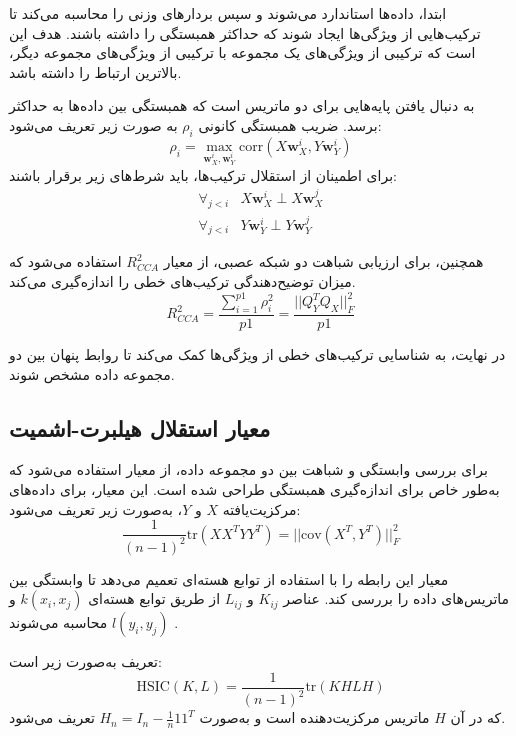  ابتدا، داده‌ها استاندارد می‌شوند و سپس  
 بردارهای وزنی را محاسبه می‌کند تا ترکیب‌هایی از ویژگی‌ها ایجاد شوند که حداکثر همبستگی را داشته باشند. هدف این است که ترکیبی از ویژگی‌های یک مجموعه با ترکیبی از ویژگی‌های مجموعه دیگر، بالاترین ارتباط را داشته باشد.  
 
 به دنبال یافتن پایه‌هایی برای دو ماتریس است که همبستگی بین داده‌ها به حداکثر برسد. ضریب همبستگی کانونی  
 \(\rho_i\)  
 به صورت زیر تعریف می‌شود:  
 \[
 \rho_i = \max_{\mathbf{w}_X^i, \mathbf{w}_Y^i} \text{corr}(X \mathbf{w}_X^i, Y \mathbf{w}_Y^i)
 \]  
 برای اطمینان از استقلال ترکیب‌ها، باید شرط‌های زیر برقرار باشند:  
 \[
 \begin{array}{ll}
 	\forall_{j<i} & X \mathbf{w}_X^i \perp X \mathbf{w}_X^j \\
 	\forall_{j<i} & Y \mathbf{w}_Y^i \perp Y \mathbf{w}_Y^j
 \end{array}
 \]  
 
 همچنین، برای ارزیابی شباهت دو شبکه عصبی، از معیار  
 \( R^2_{CCA} \)  
 استفاده می‌شود که میزان توضیح‌دهندگی ترکیب‌های خطی را اندازه‌گیری می‌کند.  
 \[
 R^2_{CCA} = \frac{\sum_{i=1}^{p1} \rho^2_i}{p1} = \frac{||Q^T_Y Q_X||^2_F}{p1}
 \]  
 
 در نهایت،  
 به شناسایی ترکیب‌های خطی از ویژگی‌ها کمک می‌کند تا روابط پنهان بین دو مجموعه داده مشخص شوند. 
 
 
 
 
 
 \subsection{
 	معیار استقلال هیلبرت-اشمیت%
 }
 برای بررسی وابستگی و شباهت بین دو مجموعه داده، از معیار  
 استفاده می‌شود که به‌طور خاص برای اندازه‌گیری همبستگی طراحی شده است. این معیار، برای داده‌های مرکزیت‌یافته \( X \) و \( Y \)، به‌صورت زیر تعریف می‌شود:  
 \[
 \frac{1}{(n - 1)^2} \text{tr}(XX^TYY^T) = ||\text{cov}(X^T, Y^T)||_F^2
 \]  
 
 معیار  
 این رابطه را با استفاده از توابع هسته‌ای تعمیم می‌دهد تا وابستگی بین ماتریس‌های داده را بررسی کند. عناصر \( K_{ij} \) و \( L_{ij} \) از طریق توابع هسته‌ای \( k(x_i, x_j) \) و \( l(y_i, y_j) \) محاسبه می‌شوند  
 \cite{gretton2005measuring}.  
 
 تعریف  
 به‌صورت زیر است:  
 \[
 \text{HSIC}(K, L) = \frac{1}{(n - 1)^2} \text{tr}(KHLH)
 \]  
 که در آن \( H \) ماتریس مرکزیت‌دهنده است و به‌صورت  
 \( H_n = I_n - \frac{1}{n} 11^T \)  
 تعریف می‌شود.  
 
